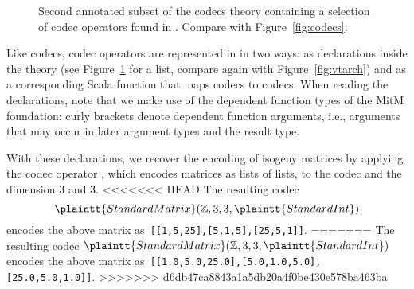 \begin{figure}[ht]\centering
  \caption[List of Codec Operators]{
    Second annotated subset of the codecs theory containing a selection of codec operators found in \mmt. 
    Compare with Figure~\ref{fig:codecs}. 
  }
  \label{fig:codecops}
\end{figure}
Like codecs, codec operators are represented in \mmt in two ways: as declarations inside the theory  (see Figure~\ref{fig:codecops} for a list, compare again with Figure~\ref{fig:vtarch}) and as a corresponding Scala function that maps codecs to codecs. 
When reading the declarations, note that we make use of the dependent function types of the MitM foundation: curly brackets denote dependent function arguments, i.e., arguments that may occur in later argument types and the result type.

With these declarations, we recover the \lmfdb encoding of isogeny matrices by applying the codec operator , which encodes matrices as lists of lists, to the codec  and the dimension $3$ and $3$.
<<<<<<< HEAD
The resulting codec
\[\plaintt{StandardMatrix}(\mathbb{Z}, 3, 3, \plaintt{StandardInt})\]
encodes the above matrix as\ \lstinline|[[1,5,25],[5,1,5],[25,5,1]]|.
=======
The resulting codec $\plaintt{StandardMatrix}(\mathbb{Z}, 3, 3, \plaintt{StandardInt})$ encodes the above matrix as\ \lstinline|[[1.0,5.0,25.0],[5.0,1.0,5.0],[25.0,5.0,1.0]]|.
>>>>>>> d6db47ca8843a1a5db20a4f0be430e578ba463ba

